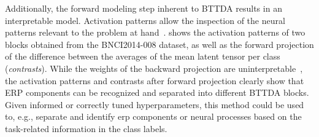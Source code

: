 \documentclass[twocolumn]{article}
\begin{document}

Additionally, the forward modeling step inherent to BTTDA results
in an interpretable model.
Activation patterns allow the inspection of the
neural patterns relevant to the problem at hand~\cite{Haufe2014}.
shows the activation patterns
of two blocks obtained from the BNCI2014-008 dataset, as well as the forward
projection of the difference between the averages of the mean latent tensor per
class (\emph{contrasts}).
While the weights of the backward projection are
uninterpretable~\cite{Haufe2014},
the activation patterns and contrasts after forward projection clearly show
that ERP components can be recognized and separated into different
BTTDA blocks.
Given informed or correctly tuned hyperparameters, this method could be used to,
e.g., separate and identify \ac{erp} components or neural processes based on the task-related
information in the class labels.
\end{document}
